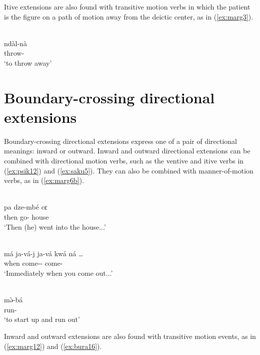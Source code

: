 Itive extensions are also found with transitive motion verbs in which the patient is the figure on a path of motion away from the deictic center, as in (\ref{ex:marg3}). 

\ea\label{ex:marg3}
 \\
\gll ndàl-nà	\\
throw-		\\
\glt `to throw away'
\z 

\section{Boundary-crossing directional extensions} \label{sec:bounded1}

Boundary-crossing directional extensions express one of a pair of directional meanings: inward or outward. Inward and outward directional extensions can be combined with directional motion verbs, such as the ventive and itive verbs in (\ref{ex:psik12}) and (\ref{ex:saku5}). They can also be combined with manner-of-motion verbs, as in (\ref{ex:marg6b}).

\ea\label{ex:psik12}
 \\
\gll pa dze-mbé cɛ	\\
then go- house	\\
\glt `Then (he) went into the house...'

\ex\label{ex:saku5}
 \\
\gll má ja-vá-j ja-vá kwá ná … \\
when come-- come-   \\
\glt `Immediately when you come out...'

\ex\label{ex:marg6b}
 \\
\gll mə̀-bá	\\
run-		\\
\glt `to start up and run out'
\z

Inward and outward extensions are also found with transitive motion events, as in (\ref{ex:marg12}) and (\ref{ex:bura16}).


